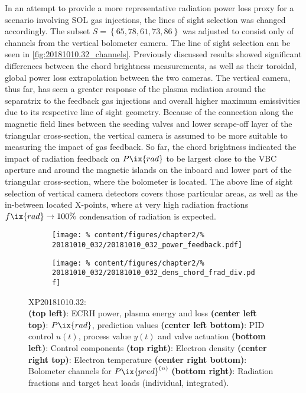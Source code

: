%
            In an attempt to provide a more representative radiation power loss proxy for a scenario involving SOL gas injections, the lines of sight selection was changed accordingly. The subset $S=\left\{65, 78, 61, 73, 86\right\}$ was adjusted to consist only of channels from the vertical bolometer camera. The line of sight selection can be seen in \cref{fig:20181010.32_channels}. Previously discussed results showed significant differences between the chord brightness measurements, as well as their toroidal, global power loss extrapolation between the two cameras. The vertical camera, thus far, has seen a greater response of the plasma radiation around the separatrix to the feedback gas injections and overall higher maximum emissivities due to its respective line of sight geometry. Because of the connection along the magnetic field lines between the seeding valves and lower scrape-off layer of the triangular cross-section, the vertical camera is assumed to be more suitable to measuring the impact of gas feedback. So far, the chord brightness indicated the impact of radiation feedback on $P\ix{rad}$ to be largest close to the VBC aperture and around the magnetic islands on the inboard and lower part of the triangular cross-section, where the bolometer is located. The above line of sight selection of vertical camera detectors covers those particular areas, as well as the in-between located X-points, where at very high radiation fractions $f\ix{rad}\rightarrow100\%$ condensation of radiation is expected.\\%
%
            \begin{figure}%
                \centering%
                \begin{subfigure}{.48\textwidth}%
                    \centering%
                    \texttt{[image: \%
                        content/figures/chapter2/\%
                        20181010\_032/20181010\_032\_power\_feedback.pdf]}%
                \end{subfigure}%
                \hfill%
                \begin{subfigure}{.48\textwidth}%
                    \centering%
                    \texttt{[image: \%
                        content/figures/chapter2/\%
                        20181010\_032/20181010\_032\_dens\_chord\_frad\_div.pdf]}%
                \end{subfigure}%
                \caption{%
                    XP20181010.32:\\%
                    \textbf{(top left)}: ECRH power, plasma energy and loss \textbf{(center left top)}: $P\ix{rad}$, prediction values \textbf{(center left bottom)}: PID control $u\left(t\right)$, process value $y\left(t\right)$ and valve actuation \textbf{(bottom left)}: Control components \textbf{(top right)}: Electron density \textbf{(center right top)}: Electron temperature \textbf{(center right bottom)}: Bolometer channels for $P\ix{pred}^{\left(n\right)}$ \textbf{(bottom right)}: Radiation fractions and target heat loads (individual, integrated).}\label{fig:20181010.32_PDF}%
            \end{figure}%
